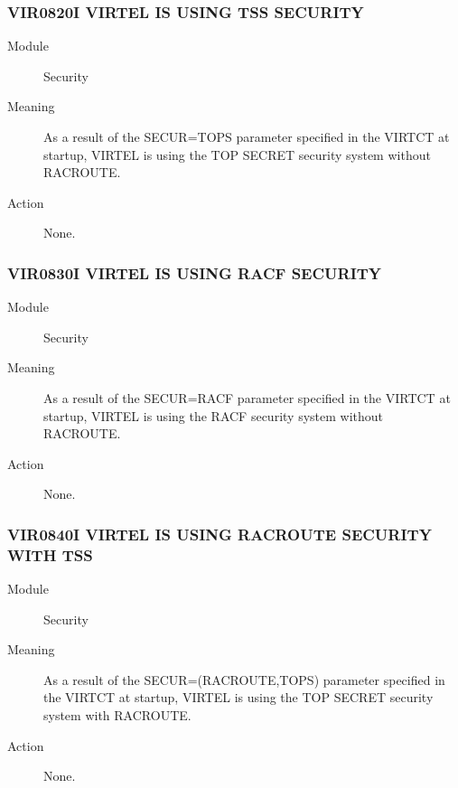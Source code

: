 \documentclass[letterpaper,10pt,english]{sphinxmanual}
\begin{document}
\subsubsection{VIR0820I VIRTEL IS USING TSS SECURITY}
\label{\detokenize{messages:vir0820i-virtel-is-using-tss-security}}\begin{description}
\item[{Module}] \leavevmode
Security

\item[{Meaning}] \leavevmode
As a result of the SECUR=TOPS parameter specified in the VIRTCT at startup, VIRTEL is using the TOP SECRET security system without RACROUTE.

\item[{Action}] \leavevmode
None.

\end{description}


\subsubsection{VIR0830I VIRTEL IS USING RACF SECURITY}
\label{\detokenize{messages:vir0830i-virtel-is-using-racf-security}}\begin{description}
\item[{Module}] \leavevmode
Security

\item[{Meaning}] \leavevmode
As a result of the SECUR=RACF parameter specified in the VIRTCT at startup, VIRTEL is using the RACF security system without RACROUTE.

\item[{Action}] \leavevmode
None.

\end{description}


\subsubsection{VIR0840I VIRTEL IS USING RACROUTE SECURITY WITH TSS}
\label{\detokenize{messages:vir0840i-virtel-is-using-racroute-security-with-tss}}\begin{description}
\item[{Module}] \leavevmode
Security

\item[{Meaning}] \leavevmode
As a result of the SECUR=(RACROUTE,TOPS) parameter specified in the VIRTCT at startup, VIRTEL is using the TOP SECRET security system with RACROUTE.

\item[{Action}] \leavevmode
None.

\end{description}
\end{document}
